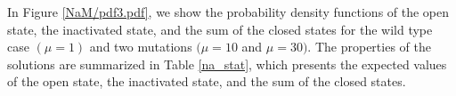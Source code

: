 In Figure \ref{NaM/pdf3.pdf}, we show the
probability density functions of the open state, the inactivated state, and the
sum of the closed states for the wild type case $(\mu=1)$ and two mutations
$(\mu=10$ and $\mu=30).$ The properties of the solutions are summarized in
Table \ref{na_stat}, which presents the expected values of the open state, the
inactivated state, and the sum of the closed states.






